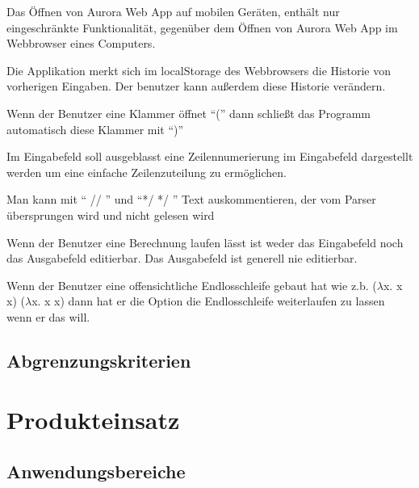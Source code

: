 \documentclass[parskip=full,11pt,twoside]{scrartcl}
\begin{document}
Das Öffnen von Aurora Web App auf mobilen Geräten, enthält nur eingeschränkte Funktionalität, gegenüber dem Öffnen von Aurora Web App im Webbrowser eines Computers.

Die Applikation merkt sich im localStorage des Webbrowsers die Historie von vorherigen Eingaben. Der benutzer kann außerdem diese Historie verändern.



Wenn der Benutzer eine Klammer öffnet \enquote{(} dann schließt das Programm automatisch diese Klammer mit \enquote{)}

Im Eingabefeld soll ausgeblasst eine Zeilennumerierung im Eingabefeld dargestellt werden um eine einfache Zeilenzuteilung zu ermöglichen.

Man kann mit \enquote{ // } und \enquote{*/ */ }  Text auskommentieren, der vom Parser übersprungen wird und nicht gelesen wird

Wenn der Benutzer eine Berechnung laufen lässt ist weder das Eingabefeld noch das Ausgabefeld editierbar. Das Ausgabefeld ist generell nie editierbar.

Wenn der Benutzer eine offensichtliche Endlosschleife gebaut hat wie z.b. ($\lambda$x. x x) ($\lambda$x. x x) dann hat er die Option die Endlosschleife weiterlaufen zu lassen wenn er das will. 
\subsection{Abgrenzungskriterien}


\pagebreak
\section{Produkteinsatz}
\subsection{Anwendungsbereiche}
\end{document}
